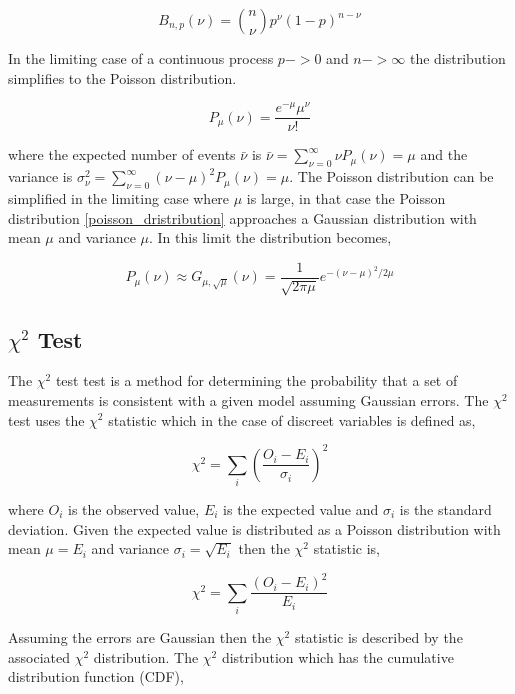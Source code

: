 \documentclass[%
 reprint,
 amsmath,amssymb,
 aps,
]{revtex4-1}
\begin{document}
\[
B_{n,p}(\nu)={n \choose \nu}p^\nu(1-p)^{n-\nu}
\]

In the limiting case of a continuous process $p -> 0$ and $n -> \infty$ the distribution simplifies to the Poisson distribution.

\begin{equation}
P_\mu(\nu)=\frac{e^{-\mu}\mu^\nu}{\nu!}
\label{poisson_dristribution}
\end{equation}

where the expected number of events $\bar{\nu}$ is $\bar{\nu}=\sum_{\nu=0}^\infty \nu P_\mu(\nu)=\mu$ and the variance is $\sigma_\nu^2=\sum_{\nu=0}^\infty(\nu-\mu)^2P_\mu(\nu) = \mu$. The Poisson distribution can be simplified in the limiting case where $\mu$ is large, in that case the Poisson distribution \eqref{poisson_dristribution} approaches a Gaussian distribution with mean $\mu$ and variance $\mu$. In this limit the distribution becomes,

\begin{equation}
P_\mu(\nu)\approx G_{\mu, \sqrt{\mu}}(\nu)=\frac{1}{\sqrt{2\pi\mu}}e^{-(\nu-\mu)^2/2\mu}
\label{poisson_gaussian_limit}
\end{equation}

\subsection{$\chi^2$ Test}
The $\chi^2$ test test is a method for determining the probability that a set of measurements is consistent with a given model assuming Gaussian errors. The $\chi^2$ test uses the $\chi^2$ statistic which in the case of discreet variables is defined as,

\[
\chi^2=\sum_{i}\left(\frac{O_i - E_i}{\sigma_i}\right)^2
\]

where $O_i$ is the observed value, $E_i$ is the expected value and $\sigma_i$ is the standard deviation. Given the expected value is distributed as a Poisson distribution with mean $\mu=E_i$ and variance $\sigma_i=\sqrt{E_i}$ then the $\chi^2$ statistic is,

\begin{equation}
\chi^2=\sum_{i}\frac{\left(O_i - E_i\right)^2}{E_i}
\label{chi_squared_statistic}
\end{equation}

Assuming the errors are Gaussian then the $\chi^2$ statistic is described by the associated $\chi^2$ distribution. The $\chi^2$ distribution which has the cumulative distribution function (CDF),
\end{document}
